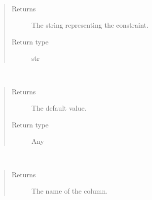 \documentclass[letterpaper,10pt,english]{sphinxmanual}
\begin{document}
\begin{fulllineitems}
\begin{fulllineitems}
\label{\detokenize{model:mini_sql.model.column.Column.get_constraint}}~\begin{quote}\begin{description}
\item[{Returns}] \leavevmode
\sphinxAtStartPar
The string representing the constraint.

\item[{Return type}] \leavevmode
\sphinxAtStartPar
str

\end{description}\end{quote}

\end{fulllineitems}


\begin{fulllineitems}
\label{\detokenize{model:mini_sql.model.column.Column.get_default}}~\begin{quote}\begin{description}
\item[{Returns}] \leavevmode
\sphinxAtStartPar
The default value.

\item[{Return type}] \leavevmode
\sphinxAtStartPar
Any

\end{description}\end{quote}

\end{fulllineitems}


\begin{fulllineitems}
\label{\detokenize{model:mini_sql.model.column.Column.get_name}}~\begin{quote}\begin{description}
\item[{Returns}] \leavevmode
\sphinxAtStartPar
The name of the column.


\end{description}
\end{quote}
\end{fulllineitems}
\end{fulllineitems}
\end{document}
